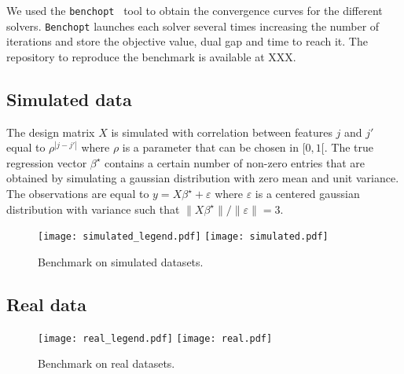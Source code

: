 We used the \texttt{benchopt}~\parencite{moreau2022benchopt} tool to obtain the convergence curves for the different solvers.
\texttt{Benchopt} launches each solver several times increasing the number of iterations and store the objective value, dual gap and time to reach it.
The repository to reproduce the benchmark is available at XXX.

\subsection{Simulated data}

The design matrix $X$ is simulated with correlation between features $j$ and $j'$ equal to $\rho^{|j-j'|}$ where $\rho$ is a parameter that can be chosen in $[0, 1[$.
The true regression vector $\beta^\star$ contains a certain number of non-zero entries that are obtained by simulating a gaussian distribution with zero mean and unit variance.
The observations are equal to $y=X\beta^\star + \varepsilon$ where $\varepsilon$ is a centered gaussian distribution with variance such that $\lVert X\beta^\star\rVert / \lVert \varepsilon \rVert = 3$.
\begin{figure*}[htb]
  \centering
  \texttt{[image: simulated\_legend.pdf]}
  \texttt{[image: simulated.pdf]}
  \caption{Benchmark on simulated datasets.}
  \label{fig:simaulted}
\end{figure*}

\subsection{Real data}
\begin{figure*}[htb]
  \centering
  \texttt{[image: real\_legend.pdf]}
  \texttt{[image: real.pdf]}
  \caption{Benchmark on real datasets.}
  \label{fig:real}
\end{figure*}
